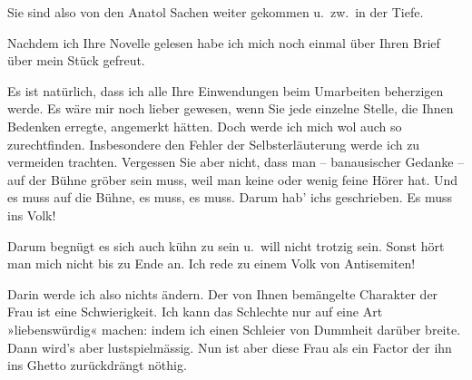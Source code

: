 \pstart
           Sie sind also von den Anatol Sachen weiter
               gekommen u. zw. in der Tiefe.\pend
           
\pstart
           Nachdem ich Ihre Novelle
               gelesen habe ich mich noch einmal über Ihren Brief über mein Stück gefreut.\pend
           
\pstart
           Es ist natürlich, dass ich alle Ihre Einwendungen beim Umarbeiten beherzigen werde.
               Es wäre mir noch lieber gewesen, wenn Sie jede einzelne Stelle, die Ihnen Bedenken
               erregte, angemerkt hätten. {\pb}Doch werde
               ich mich wol auch so zurechtfinden. Insbesondere den Fehler der Selbsterläuterung
               werde ich zu vermeiden trachten. Vergessen Sie aber nicht, dass man – banausischer
               Gedanke – auf der Bühne gröber sein muss, weil man keine oder wenig feine Hörer hat.
               Und es muss auf die Bühne, es muss, es muss. Darum hab’ ichs geschrieben. Es muss ins
               Volk!\pend
           
\pstart
           Darum begnügt es sich auch kühn zu sein u. will nicht trotzig sein. Sonst hört man
               mich nicht bis zu Ende an. Ich rede zu einem Volk von Antisemiten!\pend
           
\pstart
           Darin werde ich also nichts {\pb}ändern. Der
               von Ihnen bemängelte Charakter der Frau ist eine Schwierigkeit. Ich kann das
               Schlechte nur auf eine Art »liebenswürdig« machen: indem ich einen Schleier von
               Dummheit darüber breite. Dann wird’s aber lustspielmässig. Nun ist aber diese Frau
               als ein Factor der ihn ins Ghetto zurückdrängt nöthig.\pend
           
